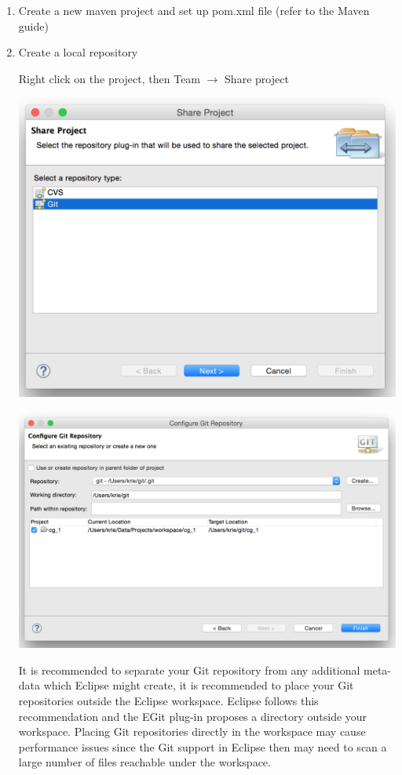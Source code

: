 \documentclass{article}
\begin{document}
\begin{enumerate}
\item Create a new maven project and set up pom.xml file (refer to the Maven guide)
\item Create a local repository

Right click on the project, then Team $\rightarrow$ Share project

\begin{center}
\includegraphics[scale=0.5]{figures/s4.png}
\end{center}

\begin{center}
\includegraphics[scale=0.5]{figures/s5.png}
\end{center}

It is recommended to separate your Git repository from any additional
meta-data which Eclipse might create, it is recommended to place your
Git repositories outside the Eclipse workspace. Eclipse follows this
recommendation and the EGit plug-in proposes a directory outside your
workspace. Placing Git repositories directly in the workspace may
cause performance issues since the Git support in Eclipse then may
need to scan a large number of files reachable under the workspace. 


\end{enumerate}
\end{document}
